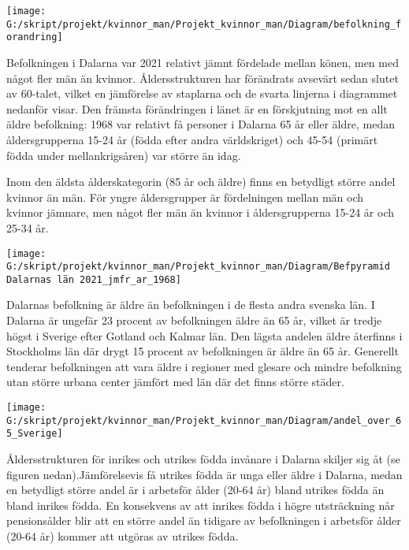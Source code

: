 \documentclass[
]{article}
\begin{document}
\begin{center}\texttt{[image: G:/skript/projekt/kvinnor\_man/Projekt\_kvinnor\_man/Diagram/befolkning\_forandring]} \end{center}

Befolkningen i Dalarna var 2021 relativt jämnt fördelade mellan könen,
men med något fler män än kvinnor. Åldersstrukturen har förändrats
avsevärt sedan slutet av 60-talet, vilket en jämförelse av staplarna och
de svarta linjerna i diagrammet nedanför visar. Den främsta förändringen
i länet är en förskjutning mot en allt äldre befolkning: 1968 var
relativt få personer i Dalarna 65 år eller äldre, medan åldersgrupperna
15-24 år (födda efter andra världskriget) och 45-54 (primärt födda under
mellankrigsåren) var större än idag.

Inom den äldsta ålderskategorin (85 år och äldre) finns en betydligt
större andel kvinnor än män. För yngre åldersgrupper är fördelningen
mellan män och kvinnor jämnare, men något fler män än kvinnor i
åldersgrupperna 15-24 år och 25-34 år.

\begin{center}\texttt{[image: G:/skript/projekt/kvinnor\_man/Projekt\_kvinnor\_man/Diagram/Befpyramid Dalarnas län 2021\_jmfr\_ar\_1968]} \end{center}

Dalarnas befolkning är äldre än befolkningen i de flesta andra svenska
län. I Dalarna är ungefär 23 procent av befolkningen äldre än 65 år,
vilket är tredje högst i Sverige efter Gotland och Kalmar län. Den
lägsta andelen äldre återfinns i Stockholms län där drygt 15 procent av
befolkningen är äldre än 65 år. Generellt tenderar befolkningen att vara
äldre i regioner med glesare och mindre befolkning utan större urbana
center jämfört med län där det finns större städer.

\begin{center}\texttt{[image: G:/skript/projekt/kvinnor\_man/Projekt\_kvinnor\_man/Diagram/andel\_over\_65\_Sverige]} \end{center}

Åldersstrukturen för inrikes och utrikes födda invånare i Dalarna
skiljer sig åt (se figuren nedan).Jämförelsevis få utrikes födda är unga
eller äldre i Dalarna, medan en betydligt större andel är i arbetsför
ålder (20-64 år) bland utrikes födda än bland inrikes födda. En
konsekvens av att inrikes födda i högre utsträckning når pensionsålder
blir att en större andel än tidigare av befolkningen i arbetsför ålder
(20-64 år) kommer att utgöras av utrikes födda.
\end{document}
